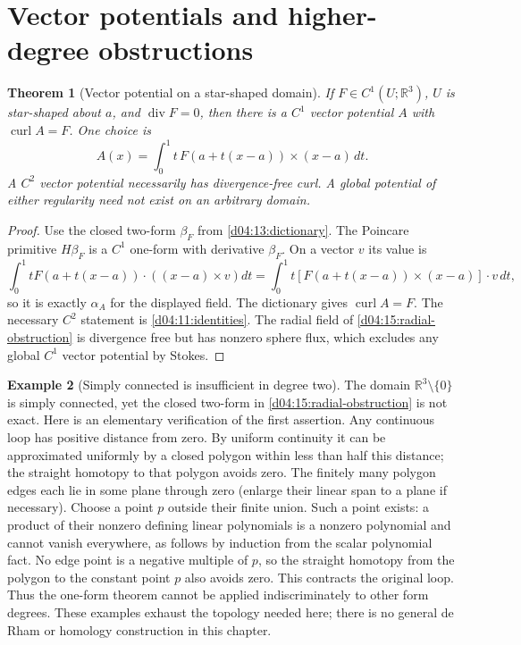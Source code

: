 \documentclass[11pt,oneside,openany]{book}
\newtheorem{theorem}{Theorem}[chapter]
\theoremstyle{definition}
\newtheorem{example}[theorem]{Example}
\theoremstyle{remark}
\newcommand{\R}{\mathbb R}
\newcommand{\family}[1]{}
\begin{document}
\section{Vector potentials and higher-degree obstructions}
\family{K04.11.10}
\begin{theorem}[Vector potential on a star-shaped domain]\label{d04:11:vector-potential}
If $F\in C^1(U;\R^3)$, $U$ is star-shaped about $a$, and
$\operatorname{div}F=0$, then there is a $C^1$ vector potential $A$ with
$\operatorname{curl}A=F$. One choice is
\[
 A(x)=\int_0^1t\,F(a+t(x-a))\times(x-a)\,dt.
\]
A $C^2$ vector potential necessarily has divergence-free curl. A global
potential of either regularity need not exist on an arbitrary domain.
\end{theorem}
\begin{proof}
Use the closed two-form $\beta_F$ from \cref{d04:13:dictionary}.
The Poincare primitive $H\beta_F$ is a $C^1$ one-form with derivative
$\beta_F$. On a vector $v$ its value is
\[
 \int_0^1t F(a+t(x-a))\cdot((x-a)\times v)dt
 =\int_0^1t[F(a+t(x-a))\times(x-a)]\cdot v\,dt,
\]
so it is exactly $\alpha_A$ for the displayed field. The dictionary gives
$\operatorname{curl}A=F$. The necessary $C^2$ statement is
\cref{d04:11:identities}. The radial field of
\cref{d04:15:radial-obstruction} is divergence free but has nonzero sphere
flux, which excludes any global $C^1$ vector potential by Stokes.
\end{proof}

\begin{example}[Simply connected is insufficient in degree two]\label{d04:11:punctured-three}
The domain $\R^3\setminus\{0\}$ is simply connected, yet the closed
two-form in \cref{d04:15:radial-obstruction} is not exact.
Here is an elementary verification of the first assertion. Any continuous
loop has positive distance from zero. By uniform continuity it can be
approximated uniformly by a closed polygon within less than half this
distance; the straight homotopy to that polygon avoids zero. The finitely
many polygon edges each lie in some plane through zero (enlarge their
linear span to a plane if necessary). Choose a point $p$ outside their
finite union. Such a point exists: a product of their nonzero defining
linear polynomials is a nonzero polynomial and cannot vanish everywhere,
as follows by induction from the scalar polynomial fact. No edge point
is a negative multiple of $p$, so the straight homotopy from the polygon
to the constant point $p$ also avoids zero. This contracts the original
loop. Thus the one-form theorem cannot be applied indiscriminately to
other form degrees. These examples exhaust the topology needed here;
there is no general de Rham or homology construction in this chapter.
\end{example}
\end{document}
